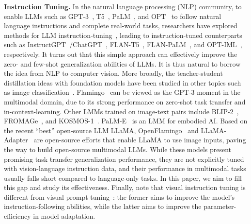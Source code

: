 \textbf{Instruction Tuning.} In the natural language processing (NLP) community, to enable LLMs such as GPT-3~\cite{brown2020language}, T5~\cite{raffel2020exploring}, PaLM~\cite{chowdhery2022palm}, and OPT~\cite{zhang2022opt} to follow natural language instructions 
and complete real-world tasks, researchers have explored methods for LLM instruction-tuning~\citep{ouyang2022training,wang2022benchmarking,wang2022self}, leading to instruction-tuned counterparts such as InstructGPT~\cite{ouyang2022training}/ChatGPT~\cite{chatgpt}, FLAN-T5~\cite{chung2022scaling}, FLAN-PaLM~\cite{chung2022scaling}, and OPT-IML~\cite{iyer2022opt}, respectively.  
It turns out that this simple approach can effectively improve the zero- and few-shot generalization abilities of LLMs. It is thus natural to borrow the idea from NLP to computer vision. More broadly, the teacher-student distillation ideas with foundation models have been studied in other topics such as image classification~\cite{faghri2023reinforce}. Flamingo~\cite{alayrac2022flamingo} can be viewed as the GPT-3 moment in the multimodal domain, due to its strong performance on zero-shot task transfer and in-context-learning. Other LMMs trained on image-text pairs include BLIP-2~\cite{li2023blip}, FROMAGe~\cite{koh2023grounding}, and KOSMOS-1~\citep{huang2023language}. 
PaLM-E~\cite{driess2023palm} is an LMM for embodied AI.
Based on the recent ``best'' open-source LLM LLaMA, OpenFlamingo~\citep{anas_awadalla_2023_7733589} and LLaMA-Adapter~\citep{zhang2023llama} are open-source efforts that enable LLaMA to use image inputs, paving the way to build open-source multimodal LLMs.
While these models present promising task transfer generalization performance, they are not explicitly tuned with vision-language instruction data, and their performance in multimodal tasks usually falls short compared to language-only tasks.
In this paper, we aim to fill this gap and study its effectiveness. Finally, note that visual instruction tuning is different from visual prompt tuning~\cite{jia2022visual}: the former aims to improve the model's instruction-following abilities, while the latter aims to improve the parameter-efficiency in model adaptation. 

